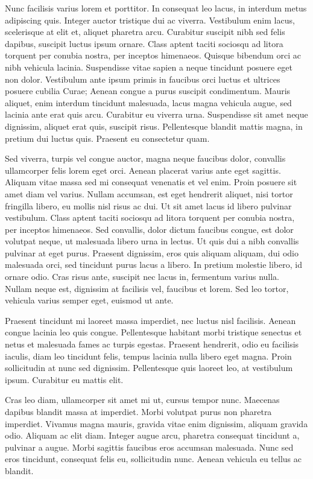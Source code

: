 Nunc facilisis varius lorem et porttitor. In consequat leo lacus, in interdum metus adipiscing quis. Integer auctor tristique dui ac viverra. Vestibulum enim lacus, scelerisque at elit et, aliquet pharetra arcu. Curabitur suscipit nibh sed felis dapibus, suscipit luctus ipsum ornare. Class aptent taciti sociosqu ad litora torquent per conubia nostra, per inceptos himenaeos. Quisque bibendum orci ac nibh vehicula lacinia. Suspendisse vitae sapien a neque tincidunt posuere eget non dolor. Vestibulum ante ipsum primis in faucibus orci luctus et ultrices posuere cubilia Curae; Aenean congue a purus suscipit condimentum. Mauris aliquet, enim interdum tincidunt malesuada, lacus magna vehicula augue, sed lacinia ante erat quis arcu. Curabitur eu viverra urna. Suspendisse sit amet neque dignissim, aliquet erat quis, suscipit risus. Pellentesque blandit mattis magna, in pretium dui luctus quis. Praesent eu consectetur quam.

Sed viverra, turpis vel congue auctor, magna neque faucibus dolor, convallis ullamcorper felis lorem eget orci. Aenean placerat varius ante eget sagittis. Aliquam vitae massa sed mi consequat venenatis et vel enim. Proin posuere sit amet diam vel varius. Nullam accumsan, est eget hendrerit aliquet, nisi tortor fringilla libero, eu mollis nisl risus ac dui. Ut sit amet lacus id libero pulvinar vestibulum. Class aptent taciti sociosqu ad litora torquent per conubia nostra, per inceptos himenaeos. Sed convallis, dolor dictum faucibus congue, est dolor volutpat neque, ut malesuada libero urna in lectus. Ut quis dui a nibh convallis pulvinar at eget purus. Praesent dignissim, eros quis aliquam aliquam, dui odio malesuada orci, sed tincidunt purus lacus a libero. In pretium molestie libero, id ornare odio. Cras risus ante, suscipit nec lacus in, fermentum varius nulla. Nullam neque est, dignissim at facilisis vel, faucibus et lorem. Sed leo tortor, vehicula varius semper eget, euismod ut ante.

Praesent tincidunt mi laoreet massa imperdiet, nec luctus nisl facilisis. Aenean congue lacinia leo quis congue. Pellentesque habitant morbi tristique senectus et netus et malesuada fames ac turpis egestas. Praesent hendrerit, odio eu facilisis iaculis, diam leo tincidunt felis, tempus lacinia nulla libero eget magna. Proin sollicitudin at nunc sed dignissim. Pellentesque quis laoreet leo, at vestibulum ipsum. Curabitur eu mattis elit.

Cras leo diam, ullamcorper sit amet mi ut, cursus tempor nunc. Maecenas dapibus blandit massa at imperdiet. Morbi volutpat purus non pharetra imperdiet. Vivamus magna mauris, gravida vitae enim dignissim, aliquam gravida odio. Aliquam ac elit diam. Integer augue arcu, pharetra consequat tincidunt a, pulvinar a augue. Morbi sagittis faucibus eros accumsan malesuada. Nunc sed eros tincidunt, consequat felis eu, sollicitudin nunc. Aenean vehicula eu tellus ac blandit.

